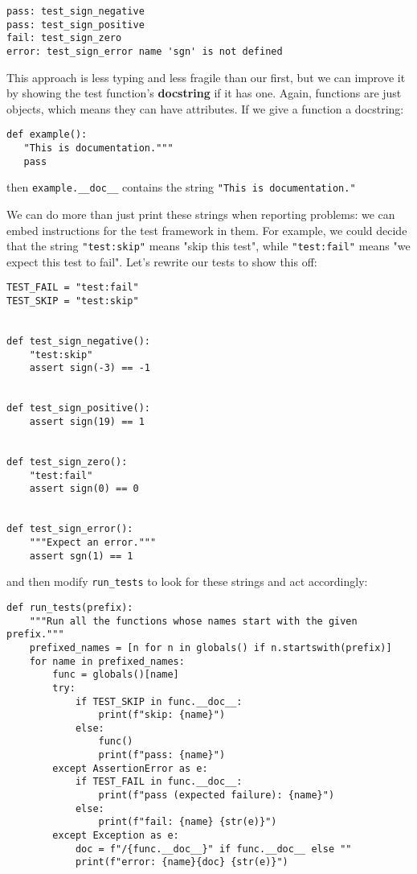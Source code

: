 \documentclass{scrbook}
\newcommand{\glossref}[1]{\textbf{#1}}
\begin{document}
\begin{lstlisting}[frame=single,frameround=tttt]
pass: test_sign_negative
pass: test_sign_positive
fail: test_sign_zero
error: test_sign_error name 'sgn' is not defined
\end{lstlisting}



This approach is less typing and less fragile than our first,
but we can improve it by showing the test function's \glossref{docstring}
if it has one.
Again,
functions are just objects,
which means they can have attributes.
If we give a function a docstring:

\begin{lstlisting}[frame=single,frameround=tttt]
def example():
   "This is documentation."""
   pass
\end{lstlisting}


then \texttt{example.\_\_doc\_\_} contains the string \texttt{"This is documentation."}


We can do more than just print these strings when reporting problems:
we can embed instructions for the test framework in them.
For example,
we could decide that the string \texttt{"test:skip"} means "skip this test",
while \texttt{"test:fail"} means "we expect this test to fail".
Let's rewrite our tests to show this off:


\begin{lstlisting}[frame=single,frameround=tttt]
TEST_FAIL = "test:fail"
TEST_SKIP = "test:skip"


def test_sign_negative():
    "test:skip"
    assert sign(-3) == -1


def test_sign_positive():
    assert sign(19) == 1


def test_sign_zero():
    "test:fail"
    assert sign(0) == 0


def test_sign_error():
    """Expect an error."""
    assert sgn(1) == 1
\end{lstlisting}



\noindent and then modify \texttt{run\_tests} to look for these strings and act accordingly:


\begin{lstlisting}[frame=single,frameround=tttt]
def run_tests(prefix):
    """Run all the functions whose names start with the given prefix."""
    prefixed_names = [n for n in globals() if n.startswith(prefix)]
    for name in prefixed_names:
        func = globals()[name]
        try:
            if TEST_SKIP in func.__doc__:
                print(f"skip: {name}")
            else:
                func()
                print(f"pass: {name}")
        except AssertionError as e:
            if TEST_FAIL in func.__doc__:
                print(f"pass (expected failure): {name}")
            else:
                print(f"fail: {name} {str(e)}")
        except Exception as e:
            doc = f"/{func.__doc__}" if func.__doc__ else ""
            print(f"error: {name}{doc} {str(e)}")
\end{lstlisting}
\end{document}
